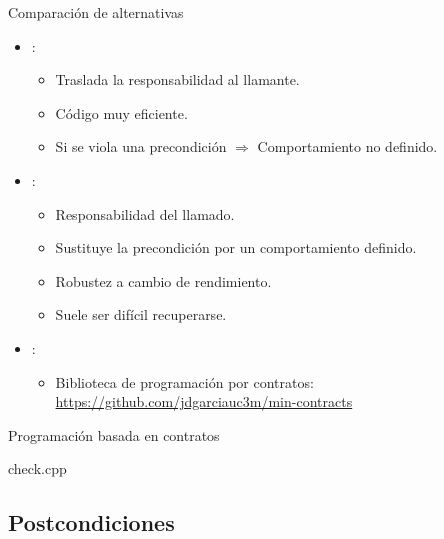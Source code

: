 \begin{frame}[t]{Comparación de alternativas}
\begin{itemize}
  \item {}:
    \begin{itemize}
      \item Traslada la responsabilidad al llamante.
      \item Código muy eficiente.
      \item Si se viola una precondición $\Rightarrow$ Comportamiento no definido.
    \end{itemize}

  \item {}:
    \begin{itemize}
      \item Responsabilidad del llamado.
      \item Sustituye la precondición por un comportamiento definido.
      \item Robustez a cambio de rendimiento.
      \item Suele ser difícil recuperarse.
    \end{itemize}

  \item {}:
    \begin{itemize}
      \item Biblioteca de programación por contratos:
            \url{https://github.com/jdgarciauc3m/min-contracts}
    \end{itemize}
\end{itemize}
\end{frame}

\begin{frame}[t]{Programación basada en contratos}
\begin{block}{check.cpp}

\end{block}
\end{frame}

\subsection{Postcondiciones}

